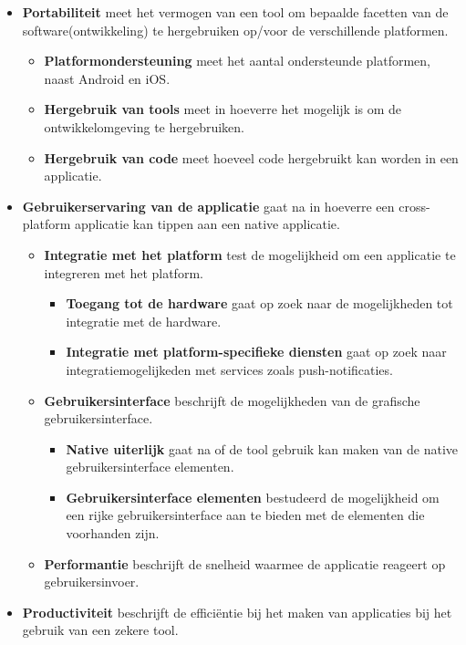 \documentclass[a4paper]{IEEEconf}
\begin{document}
\begin{itemize}
    \item \textbf{Portabiliteit} meet het vermogen van een tool om bepaalde facetten van de software(ontwikkeling) te hergebruiken op/voor de verschillende platformen.
    \begin{itemize}
        \item \textbf{Platformondersteuning} meet het aantal ondersteunde platformen, naast Android en iOS. 
        \item \textbf{Hergebruik van tools} meet in hoeverre het mogelijk is om de ontwikkelomgeving te hergebruiken.
        \item \textbf{Hergebruik van code} meet hoeveel code hergebruikt kan worden in een applicatie.
    \end{itemize}
    \item \textbf{Gebruikerservaring van de applicatie} gaat na in hoeverre een cross-platform applicatie kan tippen aan een native applicatie.
    \begin{itemize}
        \item \textbf{Integratie met het platform} test de mogelijkheid om een applicatie te integreren met het platform.
        \begin{itemize}
            \item \textbf{Toegang tot de hardware} gaat op zoek naar de mogelijkheden tot integratie met de hardware. 
            \item \textbf{Integratie met platform-specifieke diensten} gaat op zoek naar integratiemogelijkeden met services zoals push-notificaties.
        \end{itemize}
        \item \textbf{Gebruikersinterface} beschrijft de mogelijkheden van de grafische gebruikersinterface.
        \begin{itemize}
            \item \textbf{Native uiterlijk} gaat na of de tool gebruik kan maken van de native gebruikersinterface elementen.
            \item \textbf{Gebruikersinterface elementen} bestudeerd de mogelijkheid om een rijke gebruikersinterface aan te bieden met de elementen die voorhanden zijn.
        \end{itemize}
        \item \textbf{Performantie} beschrijft de snelheid waarmee de applicatie reageert op gebruikersinvoer.
    \end{itemize}
    \item \textbf{Productiviteit} beschrijft de effici\"entie bij het maken van applicaties bij het gebruik van een zekere tool. 

\end{itemize}
\end{document}
